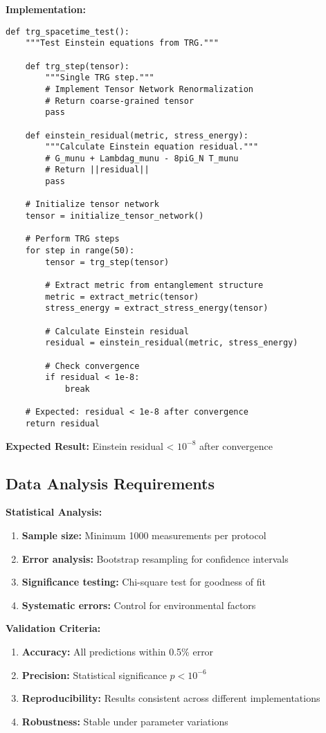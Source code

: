 \documentclass[11pt]{article}
\theoremstyle{definition}
\begin{document}
\textbf{Implementation:}
\begin{verbatim}
def trg_spacetime_test():
    """Test Einstein equations from TRG."""
    
    def trg_step(tensor):
        """Single TRG step."""
        # Implement Tensor Network Renormalization
        # Return coarse-grained tensor
        pass
    
    def einstein_residual(metric, stress_energy):
        """Calculate Einstein equation residual."""
        # G_munu + Lambdag_munu - 8piG_N T_munu
        # Return ||residual||
        pass
    
    # Initialize tensor network
    tensor = initialize_tensor_network()
    
    # Perform TRG steps
    for step in range(50):
        tensor = trg_step(tensor)
        
        # Extract metric from entanglement structure
        metric = extract_metric(tensor)
        stress_energy = extract_stress_energy(tensor)
        
        # Calculate Einstein residual
        residual = einstein_residual(metric, stress_energy)
        
        # Check convergence
        if residual < 1e-8:
            break
    
    # Expected: residual < 1e-8 after convergence
    return residual
\end{verbatim}

\textbf{Expected Result:} Einstein residual < $10^{-8}$ after convergence

\subsection{Data Analysis Requirements}

\textbf{Statistical Analysis:}
\begin{enumerate}
\item \textbf{Sample size:} Minimum 1000 measurements per protocol
\item \textbf{Error analysis:} Bootstrap resampling for confidence intervals
\item \textbf{Significance testing:} Chi-square test for goodness of fit
\item \textbf{Systematic errors:} Control for environmental factors
\end{enumerate}

\textbf{Validation Criteria:}
\begin{enumerate}
\item \textbf{Accuracy:} All predictions within 0.5\% error
\item \textbf{Precision:} Statistical significance $p < 10^{-6}$
\item \textbf{Reproducibility:} Results consistent across different implementations
\item \textbf{Robustness:} Stable under parameter variations
\end{enumerate}
\end{document}
